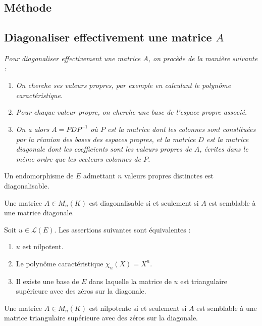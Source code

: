 \documentclass{article}
\begin{document}
\begin{itemize}[label=$\ast$]
\begin{center}
\section*{Méthode}

\subsection*{Diagonaliser effectivement une matrice \( A \)}
\textit{Pour diagonaliser effectivement une matrice \( A \), on procède de la manière suivante :}

\begin{enumerate}
    \item \textit{On cherche ses valeurs propres, par exemple en calculant le polynôme caractéristique.}
    \item \textit{Pour chaque valeur propre, on cherche une base de l'espace propre associé.}
    \item \textit{On a alors \( A = PDP^{-1} \) où \( P \) est la matrice dont les colonnes sont constituées par la réunion des bases des espaces propres, et la matrice \( D \) est la matrice diagonale dont les coefficients sont les valeurs propres de \( A \), écrites dans le même ordre que les vecteurs colonnes de \( P \).}
\end{enumerate}



\item Un endomorphisme de $E$ admettant $n$ valeurs propres distinctes est diagonalisable.

\item Une matrice $A \in M_n(K)$ est diagonalisable si et seulement si $A$ est semblable à une matrice diagonale.

\item Soit $u \in \mathcal{L}(E)$. Les assertions suivantes sont équivalentes :
\begin{enumerate}
    \item $u$ est nilpotent.
    \item Le polynôme caractéristique $\chi_u(X) = X^n$.
    \item Il existe une base de $E$ dans laquelle la matrice de $u$ est triangulaire supérieure avec des zéros sur la diagonale.
\end{enumerate}

\item Une matrice $A \in M_n(K)$ est nilpotente si et seulement si $A$ est semblable à une matrice triangulaire supérieure avec des zéros sur la diagonale.


\end{center}
\end{itemize}
\end{document}
